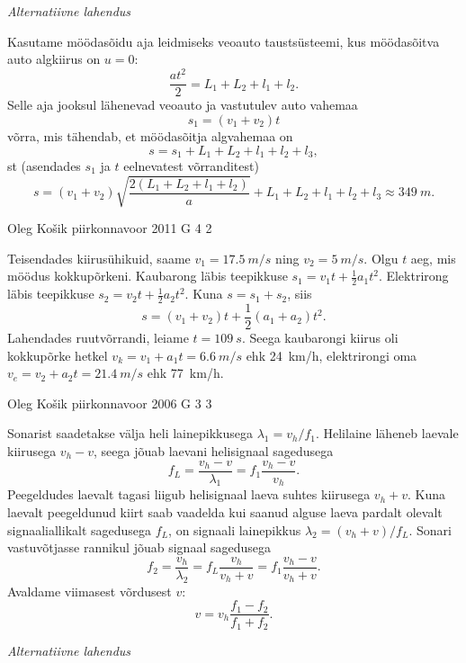 \documentclass[11pt]{article}
\begin{document}
{{\emph{Alternatiivne lahendus}

Kasutame möödasõidu aja leidmiseks veoauto taustsüsteemi, kus möödasõitva auto
algkiirus on $u = 0$:
\[
\frac{at^2}{2} = L_1 + L_2 + l_1 + l_2.
\]
Selle aja jooksul lähenevad veoauto ja vastutulev auto vahemaa
\[
s_1 = (v_1 + v_2)t 
\]
võrra, mis tähendab, et möödasõitja algvahemaa on
\[
s = s_1 + L_1 + L_2 + l_1 + l_2 + l_3 ,
\]
st (asendades $s_1$ ja $t$ eelnevatest võrranditest)
\[
s=\left(v_{1}+v_{2}\right) \sqrt{\frac{2\left(L_{1}+L_{2}+l_{1}+l_{2}\right)}{a}}+L_{1}+L_{2}+l_{1}+l_{2}+l_{3} \approx \SI{349}{m}.
\]
\fi
}

{Oleg Košik} %
{piirkonnavoor} %
{2011} %
{G 4} %
{2} %
{

\ifSolution
Teisendades kiirusühikuid, saame $v_1 = \SI{17,5}{m/s}$ ning $v_2 = \SI{5}{m/s}$. Olgu $t$ aeg, mis möödus kokkupõrkeni. Kaubarong läbis teepikkuse $s_1 = v_1t + \frac{1}{2}a_1t^2$. Elektrirong läbis teepikkuse $s_2 = v_2t + \frac{1}{2}a_2t^2$. Kuna $s = s_1 + s_2$, siis
\[
s=\left(v_{1}+v_{2}\right) t+\frac{1}{2}\left(a_{1}+a_{2}\right) t^{2}.
\]
Lahendades ruutvõrrandi, leiame $t = \SI{109}{s}$. Seega kaubarongi kiirus oli kokkupõrke hetkel $v_k = v_1 + a_1t = \SI{6,6}{m/s}$ ehk \SI{24}{km/h}, elektrirongi oma $v_e = v_2 + a_2t = \SI{21,4}{m/s}$ ehk \SI{77}{km/h}.
\fi
}

{Oleg Košik} %
{piirkonnavoor} %
{2006} %
{G 3} %
{3} %
{

\ifSolution
Sonarist saadetakse välja heli lainepikkusega $\lambda_1 = v_h/f_1$. Helilaine läheneb laevale kiirusega $v_h - v$, seega jõuab laevani helisignaal sagedusega
\[
f_L = \frac{v_h-v}{\lambda_1} = f_1 \frac{v_h-v}{v_h}.
\]
Peegeldudes laevalt tagasi liigub helisignaal laeva suhtes kiirusega $v_h + v$. Kuna laevalt peegeldunud kiirt saab vaadelda kui saanud alguse laeva pardalt olevalt signaaliallikalt sagedusega $f_L$, on signaali lainepikkus $\lambda_2 = (v_h+v)/f_L$. Sonari vastuvõtjasse rannikul jõuab signaal sagedusega
\[
f_{2}=\frac{v_{h}}{\lambda_{2}}=f_{L} \frac{v_{h}}{v_{h}+v}=f_{1} \frac{v_{h}-v}{v_{h}+v}.
\]
Avaldame viimasest võrdusest $v$:
\[
v = v_h \frac{f_1-f_2}{f_1+f_2}.
\]

\vspace{0.5\baselineskip}

\emph{Alternatiivne lahendus}

}}
\end{document}
